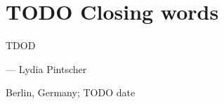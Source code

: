 \chapter*{TODO Closing words}

TDOD

\begin{flushright}--- Lydia Pintscher\end{flushright}
\begin{flushright}Berlin, Germany; TODO date\end{flushright}
